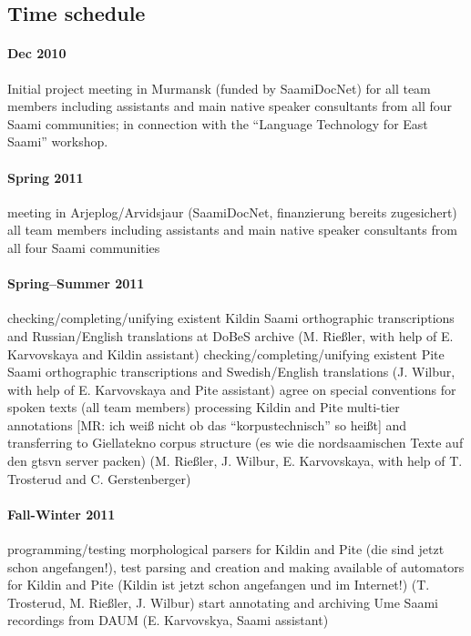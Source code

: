 \documentclass[a4paper,12pt]{article}
\begin{document}
{{{{\subsection{Time schedule}%

\paragraph{Dec 2010}Initial project meeting in Murmansk (funded by SaamiDocNet) for all team members including assistants and main native speaker consultants from all four Saami communities; in connection with the “Language Technology for East Saami” workshop.

\paragraph{Spring 2011}meeting in Arjeplog/Arvidsjaur (SaamiDocNet, finanzierung bereits zugesichert)
all team members including assistants and main native speaker consultants from all four Saami communities

\paragraph{Spring–Summer 2011}
checking/completing/unifying existent Kildin Saami orthographic transcriptions and Russian/English translations at DoBeS archive 
(M. Rießler, with help of E. Karvovskaya and Kildin assistant)
checking/completing/unifying existent Pite Saami orthographic transcriptions and Swedish/English translations
(J. Wilbur, with help of E. Karvovskaya and Pite assistant)
agree on special conventions for spoken texts
(all team members)
processing Kildin and Pite multi-tier annotations [MR: ich weiß nicht ob das “korpustechnisch” so heißt] and transferring to Giellatekno corpus structure (es wie die nordsaamischen Texte auf den gtsvn server packen)
(M. Rießler, J. Wilbur, E. Karvovskaya, with help of T. Trosterud and C. Gerstenberger)

\paragraph{Fall-Winter 2011}
programming/testing morphological parsers for Kildin and Pite (die sind jetzt schon angefangen!), test parsing and creation and making available of automators for Kildin and Pite (Kildin ist jetzt schon angefangen und im Internet!)
(T. Trosterud, M. Rießler, J. Wilbur)
start annotating and archiving Ume Saami recordings from DAUM (E. Karvovskya, Saami assistant)

}}}}
\end{document}
